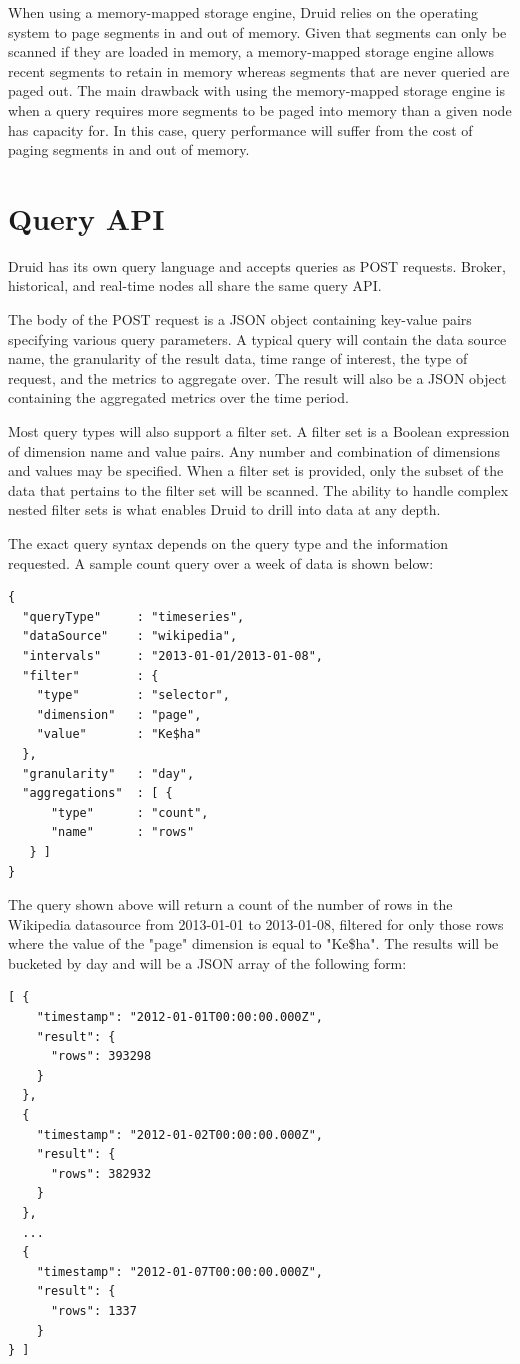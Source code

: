 \documentclass{acm_proc_article-sp}
\begin{document}
When using a memory-mapped storage engine, Druid relies on the operating system
to page segments in and out of memory.  Given that segments can only be scanned
if they are loaded in memory, a memory-mapped storage engine allows recent
segments to retain in memory whereas segments that are never queried are paged
out. The main drawback with using the memory-mapped storage engine is when a
query requires more segments to be paged into memory than a given node has
capacity for. In this case, query performance will suffer from the cost of
paging segments in and out of memory.

\section{Query API}
\label{sec:query-api}
Druid has its own query language and accepts queries as POST requests. Broker,
historical, and real-time nodes all share the same query API.

The body of the POST request is a JSON object containing key-value pairs
specifying various query parameters. A typical query will contain the data
source name, the granularity of the result data, time range of interest, the
type of request, and the metrics to aggregate over. The result will also be a
JSON object containing the aggregated metrics over the time period.

Most query types will also support a filter set. A filter set is a Boolean
expression of dimension name and value pairs. Any number and combination of
dimensions and values may be specified.  When a filter set is provided, only
the subset of the data that pertains to the filter set will be scanned.  The
ability to handle complex nested filter sets is what enables Druid to drill
into data at any depth.

The exact query syntax depends on the query type and the information requested.
A sample count query over a week of data is shown below:
\begin{verbatim}
{
  "queryType"     : "timeseries",
  "dataSource"    : "wikipedia",
  "intervals"     : "2013-01-01/2013-01-08",
  "filter"        : {
    "type"        : "selector",
    "dimension"   : "page",
    "value"       : "Ke$ha"
  },
  "granularity"   : "day",
  "aggregations"  : [ {
      "type"      : "count",
      "name"      : "rows"
   } ]
}
\end{verbatim}

The query shown above will return a count of the number of rows in the Wikipedia datasource
from 2013-01-01 to 2013-01-08, filtered for only those rows where the value of the "page" dimension is 
equal to "Ke\$ha". The results will be bucketed by day and will be a JSON array of the following form:
\begin{verbatim}
[ {
    "timestamp": "2012-01-01T00:00:00.000Z",
    "result": {
      "rows": 393298
    }
  },
  {
    "timestamp": "2012-01-02T00:00:00.000Z",
    "result": {
      "rows": 382932
    }
  },
  ...
  {
    "timestamp": "2012-01-07T00:00:00.000Z",
    "result": {
      "rows": 1337
    }
} ]
\end{verbatim}
\end{document}
